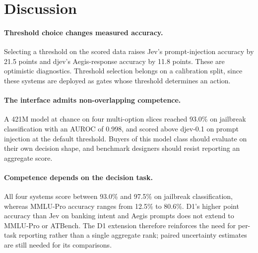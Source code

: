\section{Discussion}

\paragraph{Threshold choice changes measured accuracy.} Selecting a threshold on the scored data raises Jev's prompt-injection accuracy by 21.5 points and djev's Aegis-response accuracy by 11.8 points. These are optimistic diagnostics. Threshold selection belongs on a calibration split, since these systems are deployed as gates whose threshold determines an action.

\paragraph{The interface admits non-overlapping competence.} A 421M model at chance on four multi-option slices reached 93.0\% on jailbreak classification with an AUROC of 0.998, and scored above djev-0.1 on prompt injection at the default threshold. Buyers of this model class should evaluate on their own decision shape, and benchmark designers should resist reporting an aggregate score.

\paragraph{Competence depends on the decision task.} All four systems score between 93.0\% and 97.5\% on jailbreak classification, whereas MMLU-Pro accuracy ranges from 12.5\% to 80.6\%. D1's higher point accuracy than Jev on banking intent and Aegis prompts does not extend to MMLU-Pro or ATBench. The D1 extension therefore reinforces the need for per-task reporting rather than a single aggregate rank; paired uncertainty estimates are still needed for its comparisons.
